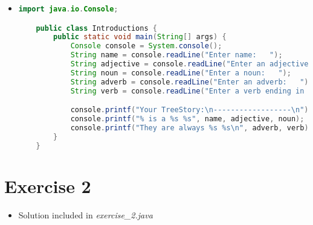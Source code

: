 \documentclass[12pt]{article}
\begin{document}
\begin{itemize}
    \item

    \begin{lstlisting}[language=java]
    import java.io.Console;

    public class Introductions {
        public static void main(String[] args) {
            Console console = System.console();
            String name = console.readLine("Enter name:   ");
            String adjective = console.readLine("Enter an adjective:   ");
            String noun = console.readLine("Enter a noun:   ");
            String adverb = console.readLine("Enter an adverb:   ");
            String verb = console.readLine("Enter a verb ending in -ing:   ");

            console.printf("Your TreeStory:\n------------------\n");
            console.printf("% is a %s %s", name, adjective, noun);
            console.printf("They are always %s %s\n", adverb, verb);
        }
    }
    \end{lstlisting}

\end{itemize}

\section{Exercise 2}

\bigskip

\begin{itemize}
    \item Solution included in \textit{exercise\_2.java}
\end{itemize}
\end{document}
